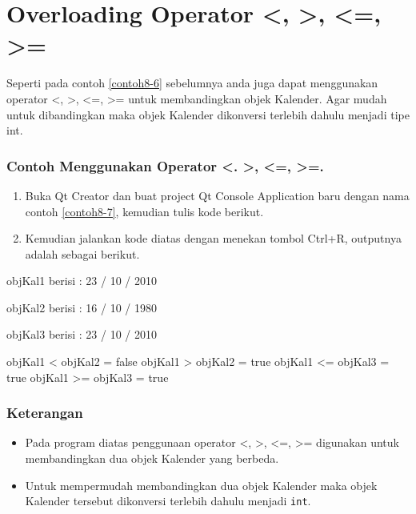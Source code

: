 \section{Overloading Operator \textless{}, \textgreater{}, \textless{}=, \textgreater{}=}\label{overloading-operator}

Seperti pada contoh \ref{contoh8-6} sebelumnya anda juga dapat menggunakan operator
\textless{}, \textgreater{}, \textless{}=, \textgreater{}= untuk
membandingkan objek Kalender. Agar mudah untuk dibandingkan maka objek
Kalender dikonversi terlebih dahulu menjadi tipe int.

\subsubsection*{Contoh Menggunakan Operator \textless{}. \textgreater{}, \textless{}=, \textgreater{}=.}
\begin{enumerate}

\item
 Buka Qt Creator dan buat project Qt Console Application baru dengan
 nama contoh \ref{contoh8-7}, kemudian tulis kode berikut.




\item
 Kemudian jalankan kode diatas dengan menekan tombol Ctrl+R, outputnya
 adalah sebagai berikut.
\end{enumerate}

\begin{lcverbatim}
objKal1 berisi :
23 / 10 / 2010

objKal2 berisi :
16 / 10 / 1980

objKal3 berisi :
23 / 10 / 2010

objKal1 < objKal2 = false
objKal1 > objKal2 = true
objKal1 <= objKal3 = true
objKal1 >= objKal3 = true
\end{lcverbatim}

\subsubsection*{Keterangan}

\begin{itemize}

\item
 Pada program diatas penggunaan operator \textless{}, \textgreater{},
 \textless{}=, \textgreater{}= digunakan untuk membandingkan dua objek
 Kalender yang berbeda.
\item
 Untuk mempermudah membandingkan dua objek Kalender maka objek Kalender
 tersebut dikonversi terlebih dahulu menjadi \texttt{int}.
\end{itemize}

